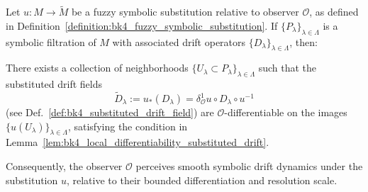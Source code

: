\begin{lemma}
\label{lemma:bk4_observer_relative_smoothness}
Let $u : M \to \tilde{M}$ be a fuzzy symbolic substitution relative to observer $\mathcal{O}$, as defined in Definition~\ref{definition:bk4_fuzzy_symbolic_substitution}. If $\{P_\lambda\}_{\lambda \in \Lambda}$ is a symbolic filtration of $M$ with associated drift operators $\{D_\lambda\}_{\lambda \in \Lambda}$, then:

There exists a collection of neighborhoods $\{U_\lambda \subset P_\lambda\}_{\lambda \in \Lambda}$ such that the substituted drift fields
\[
\tilde{D}_\lambda := u_*(D_\lambda) = \delta^1_\mathcal{O}u \circ D_\lambda \circ u^{-1}
\]
(see Def.~\ref{def:bk4_substituted_drift_field}) are $\mathcal{O}$-differentiable on the images $\{u(U_\lambda)\}_{\lambda \in \Lambda}$, satisfying the condition in Lemma~\ref{lem:bk4_local_differentiability_substituted_drift}.

Consequently, the observer $\mathcal{O}$ perceives smooth symbolic drift dynamics under the substitution $u$, relative to their bounded differentiation and resolution scale.
\end{lemma}
